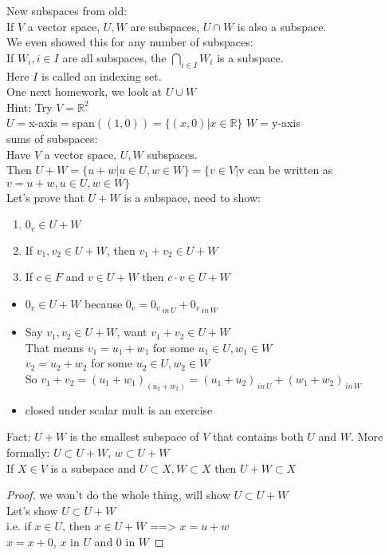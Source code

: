 \documentclass[11pt]{article}
\begin{document}
\doublespacing
New subspaces from old:\\
If $V$ a vector space, $U,W$ are subspaces, $U\cap W$ is also a subspace. \\
We even showed this for any number of subspaces:\\
If $W_i, i\in I$ are all subspaces, the $\bigcap\limits_{i\in I}W_i$ is a subspace.\\
Here $I$ is called an indexing set.\\

One next homework, we look at $U\cup W$\\
Hint: Try $V=\mathbb{R}^2$\\
$U=$x-axis$=$span$((1,0))=\{(x,0)|x\in \mathbb{R}\}$
$W=$y-axis\\
sums of subspaces:\\
Have $V$ a vector space, $U, W$ subspaces. \\
Then $U+W=\{u+w|u\in U, w\in W\}=\{v\in V|$v can be written as $v=u+w, u\in U, w\in W\}$\\
Let's prove that $U+W$ is a subspace, need to show:
\begin{enumerate}
	\item $0_v\in U+W$
	\item If $v_1, v_2\in U+W$, then $v_1+v_2\in U+W$
	\item If $c\in F$ and $v\in U+W$ then $c\cdot v\in U+W$
\end{enumerate}
\begin{itemize}
	\item $0_v\in U+W$ because $0_v = {0_v}_{\, in\, U}+{0_v}_{\, in\, W}$
	\item Say $v_1, v_2\in U+W$, want $v_1+v_2\in U+W$\\
	That means $v_1=u_1+w_1$ for some $u_1\in U, w_1\in W$\\
	$v_2=u_2+w_2$ for some $u_2\in U, w_2\in W$\\
	So $v_1+v_2=(u_1+w_1)_(u_2+w_2)=(u_1+u_2)_{\, in\, U}+(w_1+w_2)_{\, in\, W}$\\
	\item closed under scalar mult is an exercise
\end{itemize}
Fact: $U+W$ is the smallest subspace of $V$ that contains both $U$ and $W$. More formally: $U\subset U+W$, $w\subset U+W$\\
If $X\in V$ is a subspace and $U\subset X, W\subset X$ then $U+W\subset X$\\
\begin{proof}
	we won't do the whole thing, will show $U\subset U+W$\\
Let's show $U\subset U+W$\\
i.e. if $x\in U$, then $x\in U+W$ ==> $x=u+w$\\
$x=x+0$, $x$ in $U$ and 0 in $W$
\end{proof}
\end{document}
